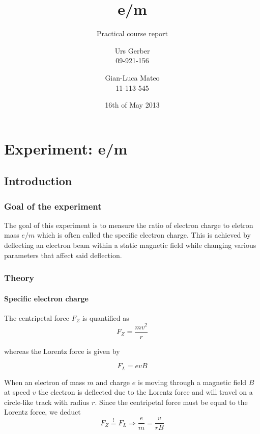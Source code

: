 \documentclass{scrreprt}
\author{Urs Gerber\\09-921-156 \and Gian-Luca Mateo\\11-113-545}
\date{16th of May 2013}
\title{e/m}
\subtitle{Practical course report}
\begin{document}
\maketitle

\tableofcontents
\newpage

\chapter{Experiment: e/m}
\section{Introduction}

\subsection{Goal of the experiment}
The goal of this experiment is to measure the ratio of electron charge to eletron mass $e/m$ which is often called the specific electron charge. This is achieved by deflecting an electron beam within a static magnetic field while changing various parameters that affect said deflection.

\subsection{Theory}
\subsubsection{Specific electron charge}

The centripetal force $F_Z$ is quantified as 
\begin{equation}
F_Z = \frac{m v^2}{r}
\end{equation}

whereas the Lorentz force is given by 

\begin{equation}
F_L = e v B
\end{equation}

When an electron of mass $m$ and charge $e$ is moving through a magnetic field $B$ at speed $v$ the electron is deflected due to the Lorentz force and will travel on a circle-like track with radius $r$. Since the centripetal force must be equal to the Lorentz force, we deduct 
\begin{equation}
F_Z \stackrel{!}{=} F_L \Longrightarrow \frac{e}{m} = \frac{v}{r B}
\end{equation}
\end{document}
